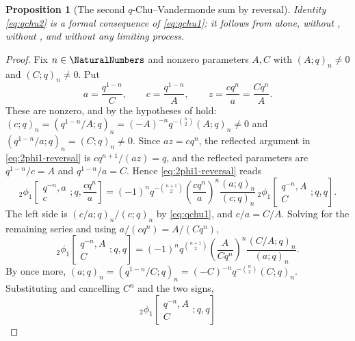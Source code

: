 \documentclass[11pt,a4paper,oneside,openany]{book}
\newtheorem{proposition}[proposition]{Proposition}
\theoremstyle{definition}
\theoremstyle{remark}
\begin{document}
\begin{proposition}[The second $q$-Chu--Vandermonde sum by reversal]\label{prop:qchu2-by-reversal}
Identity \eqref{eq:qchu2} is a formal consequence of \eqref{eq:qchu1}: it follows from  alone, without , without , and without any limiting process.
\end{proposition}

\begin{proof}
Fix $n\in\NaturalNumbers$ and nonzero parameters $A,C$ with $(A;q)_n\ne0$ and $(C;q)_n\ne0$.  Put
\[
 a=\frac{q^{1-n}}{C},\qquad
 c=\frac{q^{1-n}}{A},\qquad
 z=\frac{cq^{n}}{a}=\frac{Cq^{n}}{A}.
\]
These are nonzero, and by  the hypotheses of  hold: $(c;q)_n=(q^{1-n}/A;q)_n=(-A)^{-n}q^{-\binom n2}(A;q)_n\ne0$ and $(q^{1-n}/a;q)_n=(C;q)_n\ne0$.  Since $az=cq^{n}$, the reflected argument in \eqref{eq:2phi1-reversal} is $cq^{n+1}/(az)=q$, and the reflected parameters are $q^{1-n}/c=A$ and $q^{1-n}/a=C$.  Hence \eqref{eq:2phi1-reversal} reads
\[
 {}_2\phi_1\!\left[
 \begin{matrix}q^{-n},a\\c\end{matrix};q,\frac{cq^n}{a}\right]
 =(-1)^nq^{-\binom{n+1}{2}}
 \left(\frac{cq^{n}}{a}\right)^{n}
 \frac{(a;q)_n}{(c;q)_n}\,
 {}_2\phi_1\!\left[
 \begin{matrix}q^{-n},A\\C\end{matrix};q,q\right].
\]
The left side is $(c/a;q)_n/(c;q)_n$ by \eqref{eq:qchu1}, and $c/a=C/A$.  Solving for the remaining series and using $a/(cq^{n})=A/(Cq^{n})$,
\[
 {}_2\phi_1\!\left[
 \begin{matrix}q^{-n},A\\C\end{matrix};q,q\right]
 =(-1)^nq^{\binom{n+1}{2}}
 \left(\frac{A}{Cq^{n}}\right)^{n}
 \frac{(C/A;q)_n}{(a;q)_n}.
\]
By  once more, $(a;q)_n=(q^{1-n}/C;q)_n=(-C)^{-n}q^{-\binom n2}(C;q)_n$.  Substituting and cancelling $C^{n}$ and the two signs,
\[
 {}_2\phi_1\!\left[
 \begin{matrix}q^{-n},A\\C\end{matrix};q,q\right]
\]
\end{proof}
\end{document}

